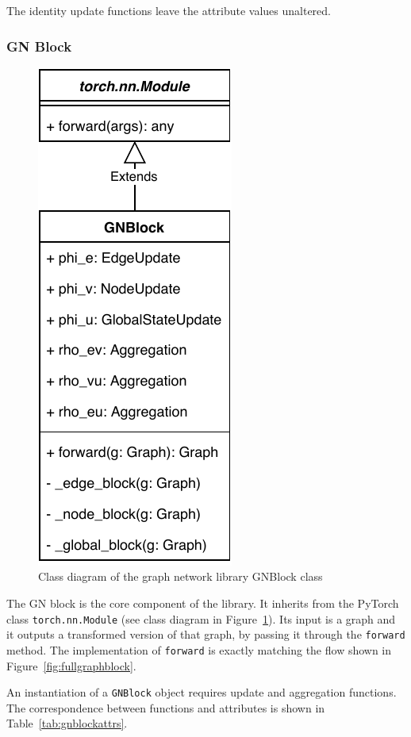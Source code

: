 The identity update functions leave the attribute values unaltered.

\subsubsection{GN Block}

\begin{figure}\centering
    \includegraphics[scale=0.65]{resources/graphnets-block}
    \caption{Class diagram of the graph network library GNBlock class}\label{fig:classdiagramgnblock}
\end{figure}

The GN block is the core component of the library. It inherits from the PyTorch class \texttt{torch.nn.Module} (see class diagram in Figure~\ref{fig:classdiagramgnblock}). Its input is a graph and it outputs a transformed version of that graph, by passing it through the \texttt{forward} method. The implementation of \texttt{forward} is exactly matching the flow shown in Figure~\ref{fig:fullgraphblock}.

An instantiation of a \texttt{GNBlock} object requires update and aggregation functions. The correspondence between functions and attributes is shown in Table~\ref{tab:gnblockattrs}.

